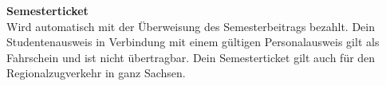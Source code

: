 \begin{multicols}{2}
\textbf{Semesterticket} \\
Wird automatisch mit der Überweisung des Semesterbeitrags bezahlt.
Dein Studentenausweis in Verbindung mit einem gültigen Personalausweis gilt als Fahrschein und ist nicht übertragbar.
Dein Semesterticket gilt auch für den Regionalzugverkehr in ganz Sachsen.




% 




\end{multicols}
